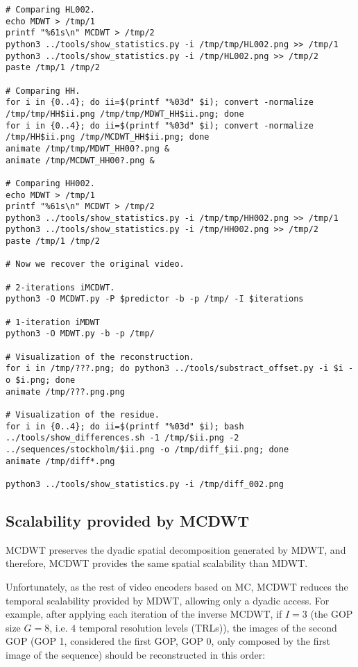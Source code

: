 \begin{verbatim}
# Comparing HL002.
echo MDWT > /tmp/1
printf "%61s\n" MCDWT > /tmp/2
python3 ../tools/show_statistics.py -i /tmp/tmp/HL002.png >> /tmp/1
python3 ../tools/show_statistics.py -i /tmp/HL002.png >> /tmp/2
paste /tmp/1 /tmp/2

# Comparing HH.
for i in {0..4}; do ii=$(printf "%03d" $i); convert -normalize /tmp/tmp/HH$ii.png /tmp/tmp/MDWT_HH$ii.png; done
for i in {0..4}; do ii=$(printf "%03d" $i); convert -normalize /tmp/HH$ii.png /tmp/MCDWT_HH$ii.png; done
animate /tmp/tmp/MDWT_HH00?.png &
animate /tmp/MCDWT_HH00?.png &

# Comparing HH002.
echo MDWT > /tmp/1
printf "%61s\n" MCDWT > /tmp/2
python3 ../tools/show_statistics.py -i /tmp/tmp/HH002.png >> /tmp/1
python3 ../tools/show_statistics.py -i /tmp/HH002.png >> /tmp/2
paste /tmp/1 /tmp/2

# Now we recover the original video.

# 2-iterations iMCDWT.
python3 -O MCDWT.py -P $predictor -b -p /tmp/ -I $iterations

# 1-iteration iMDWT
python3 -O MDWT.py -b -p /tmp/

# Visualization of the reconstruction.
for i in /tmp/???.png; do python3 ../tools/substract_offset.py -i $i -o $i.png; done
animate /tmp/???.png.png

# Visualization of the residue.
for i in {0..4}; do ii=$(printf "%03d" $i); bash ../tools/show_differences.sh -1 /tmp/$ii.png -2 ../sequences/stockholm/$ii.png -o /tmp/diff_$ii.png; done
animate /tmp/diff*.png

python3 ../tools/show_statistics.py -i /tmp/diff_002.png
\end{verbatim}

\subsection{Scalability provided by MCDWT}
MCDWT preserves the dyadic spatial decomposition generated by MDWT,
and therefore, MCDWT provides the same spatial scalability than MDWT.

Unfortunately, as the rest of video encoders based on MC, MCDWT
reduces the temporal scalability provided by MDWT, allowing only a
dyadic access. For example, after applying each iteration of the
inverse MCDWT, if $I=3$ (the GOP size $G=8$, i.e. $4$ temporal
resolution levels (TRLs)), the images of the second GOP (GOP 1,
considered the first GOP, GOP 0, only composed by the first image of
the sequence) should be reconstructed in this order:

